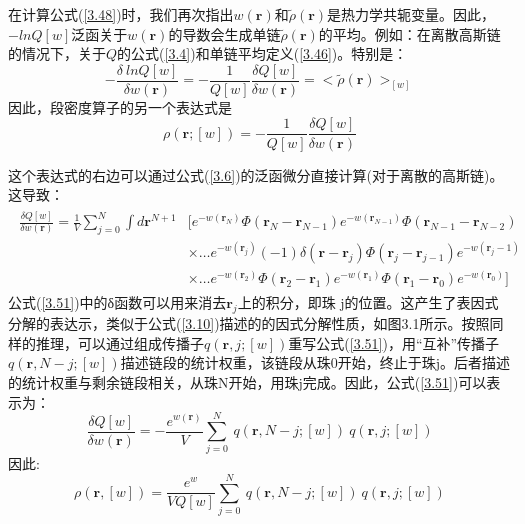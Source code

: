 在计算公式(\ref{3.48})时，我们再次指出$w(\mathbf{r})$和$\tilde{\rho}(\mathbf{r})$是热力学共轭变量。因此，$-lnQ[w]$泛函关于$w(\mathbf{r})$的导数会生成单链$\tilde{\rho}(\mathbf{r})$的平均。例如：在离散高斯链的情况下，关于$Q$的公式(\ref{3.4})和单链平均定义(\ref{3.46})。特别是：
\begin{equation}\label{3.49}
-\frac{\delta~lnQ[w]}{\delta w(\mathbf{r})}=-\frac{1}{Q[w]}\frac{\delta Q[w]}{\delta w(\mathbf{r})}=<\tilde{\rho}(\mathbf{r})>_{[w]}
\end{equation}
因此，段密度算子的另一个表达式是
\begin{equation}\label{3.50}
\rho(\mathbf{r};[w])=-\frac{1}{Q[w]}\frac{\delta Q[w]}{\delta w(\mathbf{r})}
\end{equation}

这个表达式的右边可以通过公式(\ref{3.6})的泛函微分直接计算(对于离散的高斯链)。这导致：
\begin{align}\label{3.51}
\begin{split}
\frac{\delta Q[w]}{\delta w(\mathbf{r})}=\frac{1}{V}\sum_{j=0}^{N}\int d\mathbf{r}^{N+1}&[e^{-w(\mathbf{r}_{N})}\Phi(\mathbf{r}_{N}-\mathbf{r}_{N-1})e^{-w(\mathbf{r}_{N-1})}\Phi(\mathbf{r}_{N-1}-\mathbf{r}_{N-2}) \\ &\times \ldots e^{-w(\mathbf{r}_{j})}(-1)\delta(\mathbf{r}-\mathbf{r}_j)\Phi(\mathbf{r}_j-\mathbf{r}_{j-1})e^{-w(\mathbf{r}_j-1)}\\ & \times \ldots e^{-w(\mathbf{r}_{2})}\Phi(\mathbf{r}_{2}-\mathbf{r}_{1})e^{-w(\mathbf{r}_{1})}\Phi(\mathbf{r}_{1}-\mathbf{r}_{0})e^{-w(\mathbf{r}_{0})}]
\end{split}
\end{align}
公式(\ref{3.51})中的δ函数可以用来消去$\mathbf{r}_{j}$上的积分，即珠 j的位置。这产生了表因式分解的表达示，类似于公式(\ref{3.10})描述的的因式分解性质，如图3.1所示。按照同样的推理，可以通过组成传播子$q(\mathbf{r},j;[w])$重写公式(\ref{3.51})，用“互补”传播子$q(\mathbf{r},N-j;[w])$描述链段的统计权重，该链段从珠0开始，终止于珠j。后者描述的统计权重与剩余链段相关，从珠N开始，用珠j完成。因此，公式(\ref{3.51})可以表示为：
\begin{equation}\label{3.52}
\frac{\delta Q[w]}{\delta w(\mathbf{\mathbf{\mathbf{r}}})}=-\frac{e^{w(\mathbf{r})}}{V}\sum_{j=0}^{N}~q(\mathbf{r},N-j;[w])~q(\mathbf{r},j;[w])
\end{equation}
因此:	
\begin{equation}\label{3.53}
\rho(\mathbf{r},[w])=\frac{e^{w}}{VQ[w]}\sum_{j=0}^{N}~q(\mathbf{r},N-j;[w])~q(\mathbf{r},j;[w])
\end{equation}

